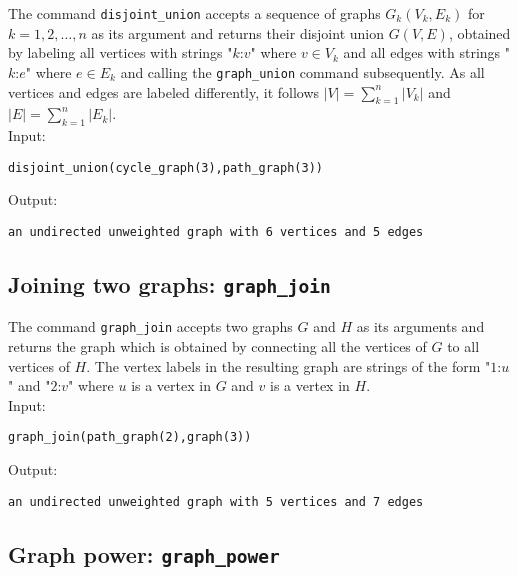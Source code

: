 \documentclass[a4paper,11pt]{article}
\begin{document}
The command {\tt disjoint\_union} accepts a sequence of graphs $ G_k(V_k,E_k) $ for $ k=1,2,\dots,n $ as its argument and returns their disjoint union $ G(V,E) $, obtained by labeling all vertices with strings "$ k $:$ v $" where $ v\in V_k $ and all edges with strings "$ k $:$ e $" where $ e\in E_k $ and calling the {\tt graph\_union} command subsequently. As all vertices and edges are labeled differently, it follows $ |V|=\sum_{k=1}^n|V_k| $ and $ |E|=\sum_{k=1}^n|E_k| $.\\
Input:
\begin{center}
  \tt disjoint\_union(cycle\_graph(3),path\_graph(3))
\end{center}
Output:
\begin{center}
  \tt an undirected unweighted graph with 6 vertices and 5 edges
\end{center}

\subsection{Joining two graphs: {\tt graph\_join}}

The command {\tt graph\_join} accepts two graphs $ G $ and $ H $ as its arguments and returns the graph which is obtained by connecting all the vertices of $ G $ to all vertices of $ H $. The vertex labels in the resulting graph are strings of the form "$ 1 $:$ u $" and "$ 2 $:$ v $" where $ u $ is a vertex in $ G $ and $ v $ is a vertex in $ H $.\\
Input:
\begin{center}
  \tt graph\_join(path\_graph(2),graph(3))
\end{center}
Output:
\begin{center}
  \tt an undirected unweighted graph with 5 vertices and 7 edges
\end{center}

\subsection{Graph power: {\tt graph\_power}}
\end{document}
